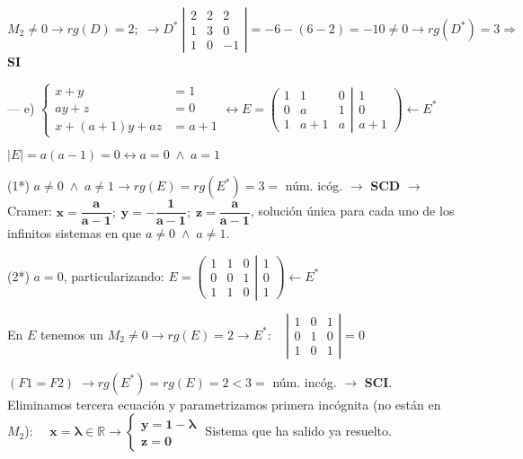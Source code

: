 \begin{proofw}
\noindent $\boxed{M_2}\neq 0 \to rg(D)=2; \;\to D^* \; \left| \begin{matrix} 2&2&2\\1&3&0\\1&0&-1 \end{matrix} \right|=-6-(6-2)=-10\neq 0 \to rg(D^*)=3 \Rightarrow $ \textbf{SI}


\noindent --- e) $\begin{cases}  x+y&=1\\ay+z&=0\\x+(a+1)y+az&=a+1   \end{cases} \leftrightarrow  E=\left( \begin{matrix}  1&1&0\\0&a&1\\1&a+1&a      \end{matrix} \right|  \left.    \begin{matrix}   1\\0\\a+1 \end{matrix} \right) \leftarrow E^*$

\noindent $|E|=a(a-1)=0 \leftrightarrow a=0 \; \wedge \; a=1$

\noindent (1*) $a\neq 0 \; \wedge \; a\neq 1 \to rg(E)=rg(E^*)=3=$ núm. icóg. $\to$ \textbf{SCD} $\to$ Cramer: $\boldsymbol{x=\dfrac {a}{a-1}; \; y=-\dfrac{1}{a-1}; \; z=\dfrac {a}{a-1}}$, solución única para cada uno de los infinitos sistemas en que $a\neq 0 \; \wedge \; a\neq 1$.

\noindent (2*) $a=0$, particularizando: $E=\left( \begin{matrix}  1&\boxed{1}&\boxed{0}\\0&\boxed{0}&\boxed{1}\\1&1&0      \end{matrix} \right|  \left.    \begin{matrix}   1\\0\\1 \end{matrix} \right) \leftarrow E^*$

\noindent En $E$ tenemos un $\boxed{M_2}\neq 0 \to rg(E)=2 \to E^*: \quad \left| \begin{matrix} 1&0&1\\0&1&0\\1&0&1 \end{matrix} \right|=0$

\noindent $(F1=F2) \; \to rg(E^*)=rg(E)=2<3=$ núm. incóg. $\to$ \textbf{SCI}. Eliminamos tercera ecuación y parametrizamos primera incógnita (no están en $M_2$): $\quad \boldsymbol{x=\lambda} \in \mathbb R \longrightarrow \begin{cases} \boldsymbol{y=1-\lambda} \\ \boldsymbol{z=0} \end{cases}$ Sistema que ha salido ya resuelto.


\end{proofw}
